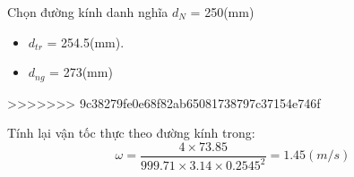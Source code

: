 Chọn đường kính danh nghĩa $d_{N}$ = 250(mm)
\begin{itemize}
	\item $d_{tr}$ = 254.5(mm).
	\item $d_{ng}$ = 273(mm)
\end{itemize}
>>>>>>> 9c38279fe0e68f82ab65081738797c37154e746f

Tính lại vận tốc thực theo đường kính trong:
\begin{equation*}
	\omega = \dfrac{4 \times 73.85 }{999.71 \times 3.14 \times 0.2545^{2}} = 1.45(m/s)
\end{equation*}